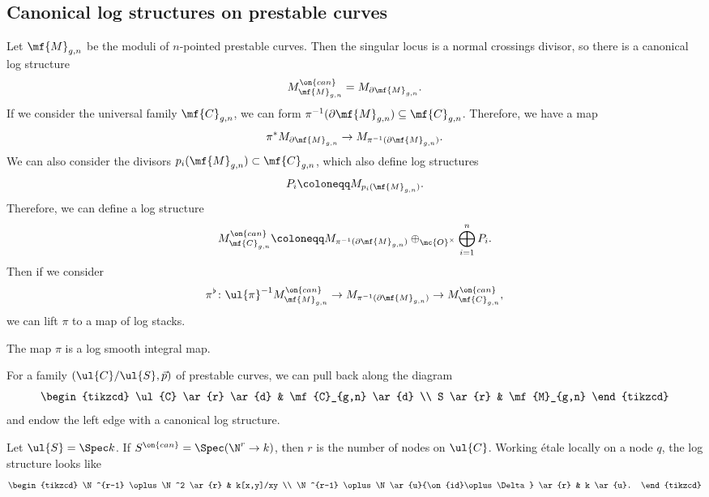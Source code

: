 \subsection{Canonical log structures on prestable curves}%
\label{sub:Canonical log structures on prestable curves}

Let \(\mf{M}_{g,n}\) be the moduli of \(n\)-pointed prestable curves. Then the singular locus is a normal crossings divisor, so there is a canonical log structure
\[ M_{\mf{M}_{g,n}}^{\on{can}} = M_{\partial \mf{M}_{g,n}}. \]
If we consider the universal family \(\mf{C}_{g,n}\), we can form \(\pi^{-1}(\partial \mf{M}_{g,n}) \subseteq \mf{C}_{g,n}\). Therefore, we have a map
\[ \pi^* M_{\partial \mf{M}_{g,n}} \to M_{\pi^{-1}(\partial \mf{M}_{g,n})}. \]
We can also consider the divisors \(p_i(\mf{M}_{g,n}) \subset \mf{C}_{g,n}\), which also define log structures
\[ P_i \coloneqq M_{p_i(\mf{M}_{g,n})}. \]
Therefore, we can define a log structure
\[ M_{\mf{C}_{g,n}}^{\on{can}} \coloneqq M_{\pi^{-1}(\partial\mf{M}_{g,n})} \oplus_{\mc{O}^{\times}} \bigoplus_{i=1}^n P_i. \]
Then if we consider
\[ \pi^{\flat} \colon \ul{\pi}^{-1} M_{\mf{M}_{g,n}}^{\on{can}} \to M_{\pi^{-1}(\partial \mf{M}_{g,n})} \to M_{\mf{C}_{g,n}}^{\on{can}}, \]
we can lift \(\pi\) to a map of log stacks.

\begin{thm}
    The map \(\pi\) is a log smooth integral map.
\end{thm}

\begin{defn}
    For a family \((\ul{C}/\ul{S}, \vec{p})\) of prestable curves, we can pull back along the diagram
    \begin{equation*}
    \begin{tikzcd}
        \ul{C} \ar{r} \ar{d} & \mf{C}_{g,n} \ar{d} \\
        S \ar{r} & \mf{M}_{g,n}
    \end{tikzcd}
    \end{equation*}
    and endow the left edge with a canonical log structure.
\end{defn}

\begin{rmk}
    Let \(\ul{S} = \Spec k\). If \(S^{\on{can}} = \Spec (\N^r \to k)\), then \(r\) is the number of nodes on \(\ul{C}\). Working \'etale locally on a node \(q\), the log structure looks like
    \begin{equation*}
    \begin{tikzcd}
        \N^{r-1} \oplus \N^2 \ar{r} & k[x,y]/xy \\
        \N^{r-1} \oplus \N \ar{u}{\on{id}\oplus\Delta} \ar{r} & k \ar{u}.
    \end{tikzcd}
    \end{equation*}
\end{rmk}

